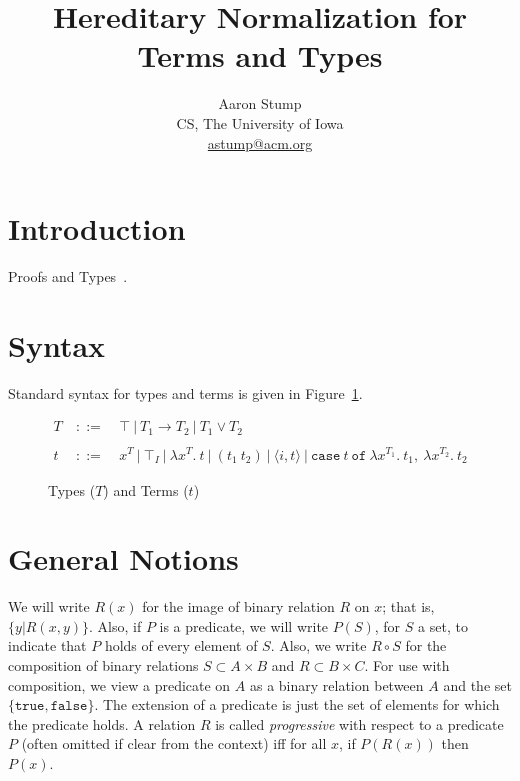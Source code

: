 \documentclass{article}
\begin{document}
\title{Hereditary Normalization for Terms and Types}

\author{Aaron Stump \\
CS, The University of Iowa \\
\url{astump@acm.org}}


\maketitle


\begin{abstract}
\end{abstract}

\section{Introduction}

Proofs and Types~\cite{pat}.

\section{Syntax}

Standard syntax for types and terms is given in
Figure~\ref{fig:syntax}.

\begin{figure}[p]
\begin{eqnarray*}
T & \ ::=\ & \top\ |\ T_1 \to T_2\ |\ T_1 \vee T_2 \\ \\
t & \ ::=\ & x^T\ |\ \top_I\ |\ \lambda x^T.\ t\ |\ (t_1\ t_2)\ |\ \langle i, t \rangle\ |\ \texttt{case}\ t\ \texttt{of}\ \lambda x^{T_1}.\ t_1,\ \lambda x^{T_2}. \ t_2
\end{eqnarray*}
\caption{\label{fig:syntax}Types ($T$) and Terms ($t$)}
\end{figure}

\section{General Notions}

We will write $R(x)$ for the image of binary relation $R$ on $x$; that
is, $\{ y | R(x,y) \}$.  Also, if $P$ is a predicate, we will write
$P(S)$, for $S$ a set, to indicate that $P$ holds of every element of
$S$.  Also, we write $R \circ S$ for the composition of binary
relations $S\subset A \times B$ and $R \subset B \times C$.  For use
with composition, we view a predicate on $A$ as a binary relation
between $A$ and the set $\{ \texttt{true}, \texttt{false}\}$.  The
extension of a predicate is just the set of elements for which the
predicate holds.  A relation $R$ is called \emph{progressive} with
respect to a predicate $P$ (often omitted if clear from the context)
iff for all $x$, if $P(R(x))$ then $P(x)$.
\end{document}
